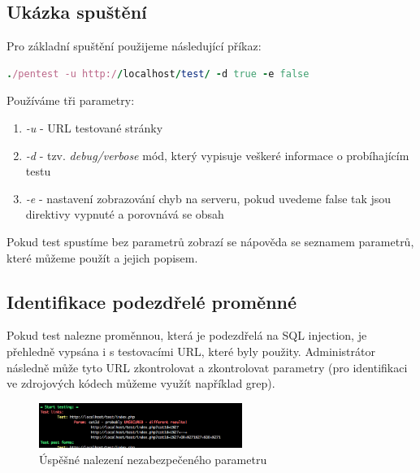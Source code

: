 \documentclass[12pt, a4paper]{report}
\begin{document}
\subsection{Ukázka spuštění}
Pro základní spuštění použijeme následující příkaz:
\begin{lstlisting}[label=SID_run,language=Ruby, caption=Spuštění testu]
./pentest -u http://localhost/test/ -d true -e false
\end{lstlisting}
Používáme tři parametry:
\begin{enumerate}
\item \textit{-u} - URL testované stránky
\item \textit{-d} - tzv. \textit{debug/verbose} mód, který vypisuje veškeré informace o probíhajícím testu
\item \textit{-e} - nastavení zobrazování chyb na serveru, pokud uvedeme false tak jsou direktivy vypnuté a porovnává se obsah
\end{enumerate}
Pokud test spustíme bez parametrů zobrazí se nápověda se seznamem parametrů, které můžeme použít a jejich popisem.

\subsection{Identifikace podezdřelé proměnné}
Pokud test nalezne proměnnou, která je podezdřelá na SQL injection, je přehledně vypsána i s testovacími URL, které byly použity. Administrátor následně může tyto URL zkontrolovat a zkontrolovat parametry (pro identifikaci ve zdrojových kódech můžeme využít například grep).
\begin{figure}[h!]
\centerline{\includegraphics[width=250px]{./examples/SID-success.png}}
\caption{Úspěšné nalezení nezabezpečeného parametru}
\label{chart.attack}
\end{figure}
\end{document}
